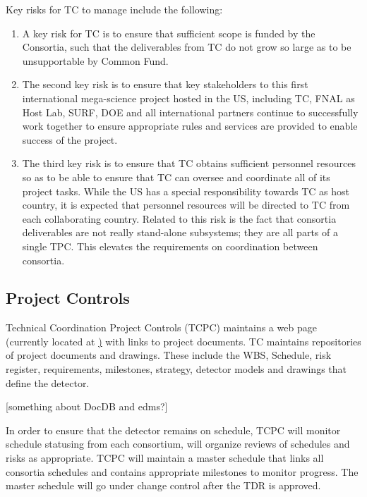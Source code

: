 Key risks for TC to manage include the following:
\begin{enumerate}
  \item A key risk for TC is to ensure that sufficient scope is funded
    by the Consortia, such that the deliverables from TC do not grow
    so large as to be unsupportable by Common Fund.
  \item The second key risk is to ensure that key stakeholders to this
    first international mega-science project hosted in the US,
    including TC, FNAL as Host Lab, SURF, DOE and all international
    partners continue to successfully work together to ensure
    appropriate rules and services are provided to enable success of
    the project.
  \item The third key risk is to ensure that TC obtains sufficient
    personnel resources so as to be able to ensure that TC can oversee
    and coordinate all of its project tasks.  While the US has a
    special responsibility towards TC as host country, it is expected
    that personnel resources will be directed to TC from each
    collaborating country. Related to this risk is the fact that
    consortia deliverables are not really stand-alone subsystems; they
    are all parts of a single TPC. This elevates the requirements on
    coordination between consortia.
\end{enumerate}


\subsection{Project Controls}
\label{sec:fdsp-coord-controls}

Technical Coordination Project Controls (TCPC) maintains a web page
(currently located at
\href{https://web.fnal.gov/collaboration/DUNE/DUNE\%20Project/\_layouts/15/start.aspx\#/})
with links to project documents. TC maintains repositories of project
documents and drawings. These include the WBS, Schedule, risk
register, requirements, milestones, strategy, detector models and
drawings that define the  detector.

[something about DocDB and edms?]

In order to ensure that the  detector remains on schedule, TCPC
will monitor schedule statusing from each consortium, will organize
reviews of schedules and risks as appropriate. TCPC will maintain a
master schedule that links all consortia schedules and contains
appropriate milestones to monitor progress. The master schedule will
go under change control after the TDR is approved.

